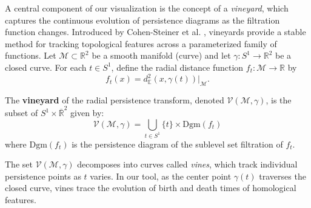 \documentclass[a4paper,english,numberwithinsect]{eurocg26-submission}
\newcommand{\M}{\mathcal{M}}
\begin{document}

A central component of our visualization is the concept of a \textit{vineyard}, which captures the continuous evolution of persistence diagrams as the filtration function changes. Introduced by Cohen-Steiner et al. \cite{CohenSteiner2006}, vineyards provide a stable method for tracking topological features across a parameterized family of functions.
Let $\mathcal{M} \subset \mathbb{R}^2$ be a smooth manifold (curve) and let $\gamma:S^1\to\mathbb{R}^2$ be a closed curve. For each $t \in S^1$, define the radial distance function $f_t: \mathcal{M} \to \mathbb{R}$ by
\[
f_t(x) = d_{\mathbb{E}}^2(x,\gamma(t))|_\M.
\]

\begin{definition}[Vineyard]
The \textbf{vineyard} of the radial persistence transform, denoted $\mathcal{V}(\mathcal{M}, \gamma)$, is the subset of $S^1 \times \overline{\mathbb{R}}^2$ given by:
\[
\mathcal{V}(\mathcal{M}, \gamma) = \bigcup_{t \in S^1} \{t\} \times \mathrm{Dgm}(f_t)
\]
where $\mathrm{Dgm}(f_t)$ is the persistence diagram of the sublevel set filtration of $f_t$.
\end{definition}

The set $\mathcal{V}(\mathcal{M}, \gamma)$ decomposes into curves called \textit{vines}, which track individual persistence points as $t$ varies. In our tool, as the center point $\gamma(t)$ traverses the closed curve, vines trace the evolution of birth and death times of homological features.




\end{document}
